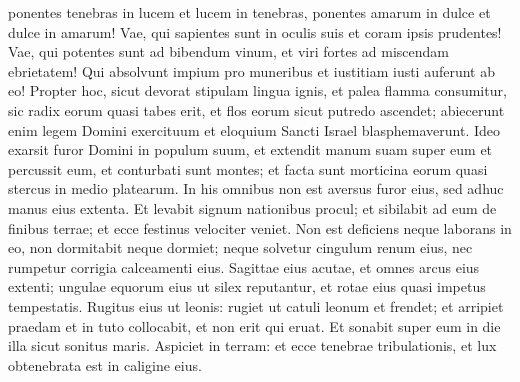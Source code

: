 \begin{biblechapter}
\begin{biblechapter}
\begin{biblechapter}
\begin{biblechapter}
\begin{biblechapter}
 ponentes tenebras in lucem et lucem in tenebras,
 ponentes amarum in dulce et dulce in amarum!
 \verse Vae, qui sapientes sunt in oculis suis
 et coram ipsis prudentes!
 \verse Vae, qui potentes sunt ad bibendum vinum,
 et viri fortes ad miscendam ebrietatem!
 \verse Qui absolvunt impium pro muneribus
 et iustitiam iusti auferunt ab eo!
 \verse Propter hoc, sicut devorat stipulam lingua ignis,
 et palea flamma consumitur,
 sic radix eorum quasi tabes erit,
 et flos eorum sicut putredo ascendet;
 abiecerunt enim legem Domini exercituum
 et eloquium Sancti Israel blasphemaverunt.
 \verse Ideo exarsit furor Domini in populum suum,
 et extendit manum suam super eum et percussit eum,
 et conturbati sunt montes;
 et facta sunt morticina eorum quasi stercus in medio platearum.
 In his omnibus non est aversus furor eius,
 sed adhuc manus eius extenta.
 \verse Et levabit signum nationibus procul;
 et sibilabit ad eum de finibus terrae;
 et ecce festinus velociter veniet.
 \verse Non est deficiens neque laborans in eo,
 non dormitabit neque dormiet;
 neque solvetur cingulum renum eius,
 nec rumpetur corrigia calceamenti eius.
 \verse Sagittae eius acutae, et omnes arcus eius extenti;
 ungulae equorum eius ut silex reputantur,
 et rotae eius quasi impetus tempestatis.
 \verse Rugitus eius ut leonis:
 rugiet ut catuli leonum et frendet;
 et arripiet praedam et in tuto collocabit,
 et non erit qui eruat.
 \verse Et sonabit super eum in die illa sicut sonitus maris.
 Aspiciet in terram: et ecce tenebrae tribulationis,
 et lux obtenebrata est in caligine eius.
 

\end{biblechapter}
\end{biblechapter}
\end{biblechapter}
\end{biblechapter}
\end{biblechapter}
